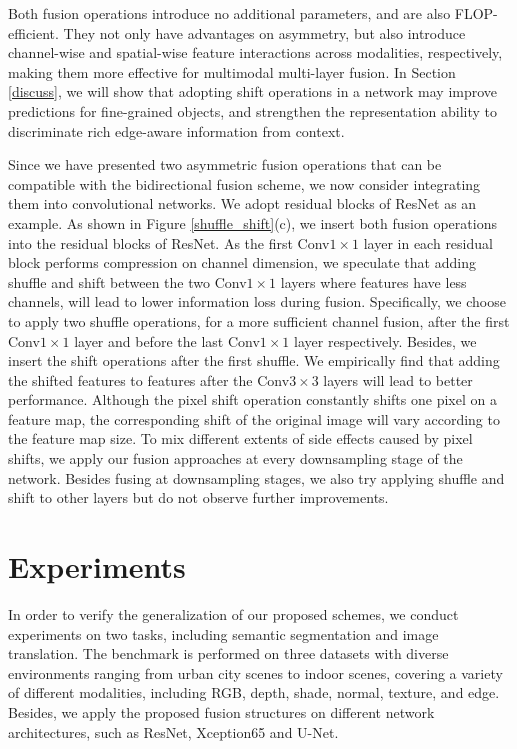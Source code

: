 \documentclass[sigconf]{acmart}
\begin{document}
Both fusion operations introduce no additional parameters, and are also FLOP-efficient. They not only have advantages on asymmetry, but also introduce channel-wise and spatial-wise feature interactions across modalities, respectively, making them more effective for multimodal multi-layer fusion. In Section \ref{discuss}, we will show that adopting shift operations in a network may improve predictions for fine-grained objects,  and strengthen the representation ability to discriminate rich edge-aware information from context.

Since we have presented two asymmetric fusion operations that can be compatible with the bidirectional fusion scheme, we now consider integrating them into convolutional networks. We adopt residual blocks of ResNet \cite{DBLP:conf/cvpr/HeZRS16} as an example. As shown in Figure \ref{shuffle_shift}(c), we insert both fusion operations into the residual blocks of ResNet. As the first Conv$1\times1$ layer in each residual block performs compression on channel dimension, we speculate that adding shuffle and shift between the two Conv$1\times1$ layers where features have less channels, will lead to lower information loss during fusion. Specifically, we choose to apply two shuffle operations, for a more sufficient channel fusion, after the first Conv$1\times1$ layer and before the last Conv$1\times1$ layer respectively. Besides, we insert the shift operations after the first shuffle. We empirically find that adding the shifted features to features after the Conv$3\times3$ layers will lead to better performance. Although the pixel shift operation constantly shifts one pixel on a feature map, the corresponding shift of the original image will vary according to the feature map size. To mix different extents of side effects caused by pixel shifts, we apply our fusion approaches at every downsampling stage of the network. Besides fusing at downsampling stages, we also try applying shuffle and shift to other layers but do not observe further improvements. 





\section{Experiments}
\label{experiments}

In order to verify the generalization of our proposed schemes, we conduct experiments on two tasks, including semantic segmentation and image translation. The benchmark is performed on three datasets with diverse environments ranging from urban city scenes to indoor scenes, covering a variety of different modalities, including RGB, depth, shade, normal, texture, and edge. Besides, we apply the proposed fusion structures on different network architectures, such as ResNet, Xception65 and U-Net.
\end{document}
